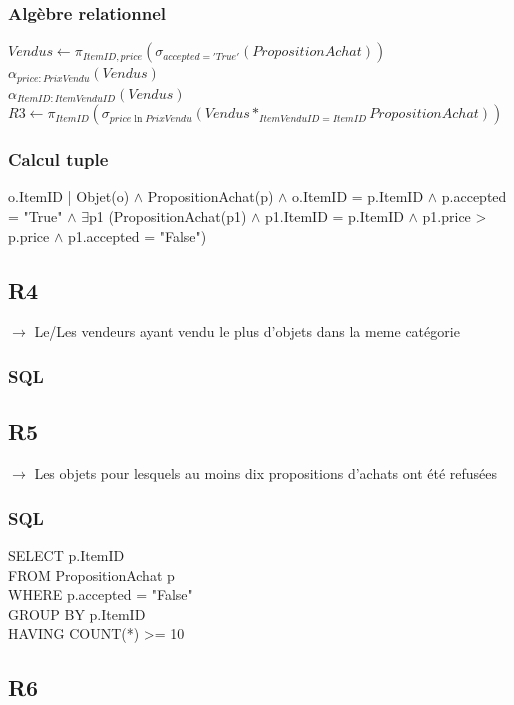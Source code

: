 \documentclass[a4paper,11pt]{article}
\begin{document}
\subsubsection{Algèbre relationnel}

$Vendus \leftarrow \pi_{ItemID, price}(\sigma_{accepted='True'}(PropositionAchat))$\\
$\alpha_{price:PrixVendu}(Vendus)$\\
$\alpha_{ItemID:ItemVenduID}(Vendus)$\\
$R3 \leftarrow \pi_{ItemID}(\sigma_{price \ln PrixVendu}(Vendus*_{ItemVenduID=ItemID}PropositionAchat)) $

\subsubsection{Calcul tuple}

o.ItemID | Objet(o) $\land$ PropositionAchat(p) $\land$ o.ItemID = p.ItemID $\land$ p.accepted = "True" $\land$ $\exists$p1 (PropositionAchat(p1) $\land$ p1.ItemID = p.ItemID $\land$ p1.price > p.price $\land$ p1.accepted = "False")
\subsection{R4}

$\rightarrow$ Le/Les vendeurs ayant vendu le plus d'objets dans la meme catégorie

\subsubsection{SQL}

\subsection{R5}

$\rightarrow$ Les objets pour lesquels au moins dix propositions d'achats ont été refusées

\subsubsection{SQL}

SELECT p.ItemID\\
FROM PropositionAchat p\\
WHERE p.accepted = "False"\\
GROUP BY p.ItemID\\
HAVING COUNT(*) >= 10

\subsection{R6}
\end{document}
